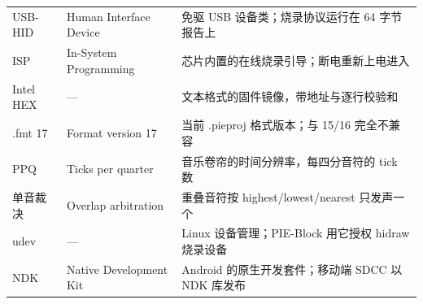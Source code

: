 \begin{center}
\begin{tabularx}{\linewidth}{@{}l l >{\raggedright\arraybackslash}X@{}}
USB-HID & Human Interface Device & 免驱 USB 设备类；烧录协议运行在 64 字节报告上 \\
ISP & In-System Programming & 芯片内置的在线烧录引导；断电重新上电进入 \\
Intel HEX & --- & 文本格式的固件镜像，带地址与逐行校验和 \\
.fmt 17 & Format version 17 & 当前 .pieproj 格式版本；与 15/16 完全不兼容 \\
PPQ & Ticks per quarter & 音乐卷帘的时间分辨率，每四分音符的 tick 数 \\
单音裁决 & Overlap arbitration & 重叠音符按 highest/lowest/nearest 只发声一个 \\
udev & --- & Linux 设备管理；PIE-Block 用它授权 hidraw 烧录设备 \\
NDK & Native Development Kit & Android 的原生开发套件；移动端 SDCC 以 NDK 库发布 \\
\bottomrule
\end{tabularx}
\end{center}

